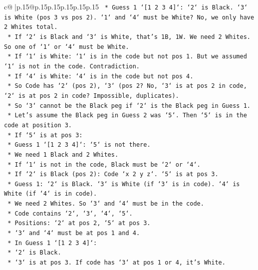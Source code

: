 \documentclass{article}
\begin{document}
{\begin{supertabular}{c@{$\;$}|p{.15\linewidth}@{}p{.15\linewidth}p{.15\linewidth}p{.15\linewidth}p{.15\linewidth}p{.15\linewidth}}
{{{\texttt{                *   Guess 1 `{[}1 2 3 4{]}`: `2` is Black. `3` is White (pos 3 vs pos 2). `1` and `4` must be White? No, we only have 2 Whites total.} \\
\texttt{                *   If `2` is Black and `3` is White, that's 1B, 1W. We need 2 Whites. So one of `1` or `4` must be White.} \\
\texttt{                *   If `1` is White: `1` is in the code but not pos 1. But we assumed `1` is not in the code. Contradiction.} \\
\texttt{                *   If `4` is White: `4` is in the code but not pos 4.} \\
\texttt{                *   So Code has `2` (pos 2), `3` (pos 2? No, `3` is at pos 2 in code, `2` is at pos 2 in code? Impossible, duplicates).} \\
\texttt{            *   So `3` cannot be the Black peg if `2` is the Black peg in Guess 1.} \\
\texttt{    *   Let's assume the Black peg in Guess 2 was `5`. Then `5` is in the code at position 3.} \\
\texttt{        *   If `5` is at pos 3:} \\
\texttt{            *   Guess 1 `{[}1 2 3 4{]}`: `5` is not there.} \\
\texttt{            *   We need 1 Black and 2 Whites.} \\
\texttt{            *   If `1` is not in the code, Black must be `2` or `4`.} \\
\texttt{            *   If `2` is Black (pos 2): Code `x 2 y z`. `5` is at pos 3.} \\
\texttt{                *   Guess 1: `2` is Black. `3` is White (if `3` is in code). `4` is White (if `4` is in code).} \\
\texttt{                *   We need 2 Whites. So `3` and `4` must be in the code.} \\
\texttt{                *   Code contains `2`, `3`, `4`, `5`.} \\
\texttt{                *   Positions: `2` at pos 2, `5` at pos 3.} \\
\texttt{                *   `3` and `4` must be at pos 1 and 4.} \\
\texttt{                *   In Guess 1 `{[}1 2 3 4{]}`:} \\
\texttt{                    *   `2` is Black.} \\
\texttt{                    *   `3` is at pos 3. If code has `3` at pos 1 or 4, it's White.} \\
}}}
\end{supertabular}}
\end{document}
